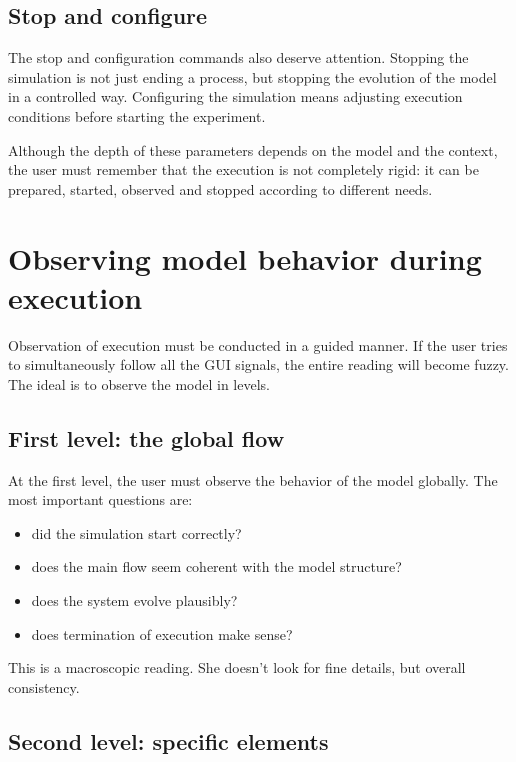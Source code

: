 \subsection{Stop and configure}
\label{subsec:cap5_parar_configurar}

The stop and configuration commands also deserve attention. Stopping the simulation is not just ending a process, but stopping the evolution of the model in a controlled way. Configuring the simulation means adjusting execution conditions before starting the experiment.

Although the depth of these parameters depends on the model and the context, the user must remember that the execution is not completely rigid: it can be prepared, started, observed and stopped according to different needs.

\section{Observing model behavior during execution}
\label{sec:cap5_observando_comportamento_execucao}

Observation of execution must be conducted in a guided manner. If the user tries to simultaneously follow all the GUI signals, the entire reading will become fuzzy. The ideal is to observe the model in levels.

\subsection{First level: the global flow}
\label{subsec:cap5_primeiro_nivel_fluxo_global}

At the first level, the user must observe the behavior of the model globally. The most important questions are:
\begin{itemize}
\item did the simulation start correctly?
\item does the main flow seem coherent with the model structure?
\item does the system evolve plausibly?
\item does termination of execution make sense?
\end{itemize}

This is a macroscopic reading. She doesn't look for fine details, but overall consistency.

\subsection{Second level: specific elements}
\label{subsec:cap5_segundo_nivel_elementos_especificos}

